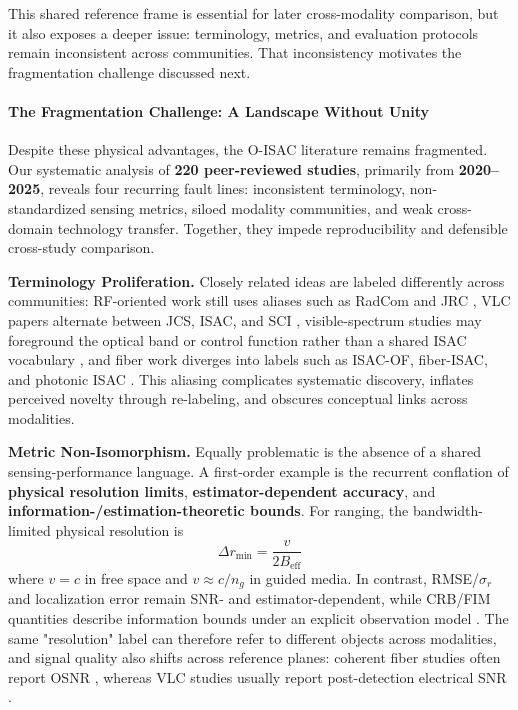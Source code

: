 \documentclass[letterpaper,journal]{IEEEtran}
\begin{document}
This shared reference frame is essential for later cross-modality comparison, but it also exposes a deeper issue: terminology, metrics, and evaluation protocols remain inconsistent across communities. That inconsistency motivates the fragmentation challenge discussed next.

\paragraph{The Fragmentation Challenge: A Landscape Without Unity}

Despite these physical advantages, the O-ISAC literature remains fragmented. Our systematic analysis of \textbf{220 peer-reviewed studies}, primarily from \textbf{2020--2025}, reveals four recurring fault lines: inconsistent terminology, non-standardized sensing metrics, siloed modality communities, and weak cross-domain technology transfer. Together, they impede reproducibility and defensible cross-study comparison.

\textbf{Terminology Proliferation.} Closely related ideas are labeled differently across communities: RF-oriented work still uses aliases such as RadCom and JRC \cite{O_ISAC_161}, VLC papers alternate between JCS, ISAC, and SCI \cite{O_ISAC_068}, visible-spectrum studies may foreground the optical band or control function rather than a shared ISAC vocabulary \cite{O_ISAC_053}, and fiber work diverges into labels such as ISAC-OF, fiber-ISAC, and photonic ISAC \cite{O_ISAC_041,O_ISAC_033}. This aliasing complicates systematic discovery, inflates perceived novelty through re-labeling, and obscures conceptual links across modalities.

\textbf{Metric Non-Isomorphism.} Equally problematic is the absence of a shared sensing-performance language. A first-order example is the recurrent conflation of \textbf{physical resolution limits}, \textbf{estimator-dependent accuracy}, and \textbf{information-/estimation-theoretic bounds}. For ranging, the bandwidth-limited physical resolution is
\begin{equation}
    \Delta r_{\min}=\frac{v}{2B_{\text{eff}}}
\end{equation}
where $v=c$ in free space and $v\approx c/n_g$ in guided media. In contrast, RMSE/$\sigma_r$ and localization error remain SNR- and estimator-dependent, while CRB/FIM quantities describe information bounds under an explicit observation model \cite{O_ISAC_013,O_ISAC_050,O_ISAC_056}. The same "resolution" label can therefore refer to different objects across modalities, and signal quality also shifts across reference planes: coherent fiber studies often report OSNR \cite{O_ISAC_028}, whereas VLC studies usually report post-detection electrical SNR \cite{O_ISAC_009}.
\end{document}
